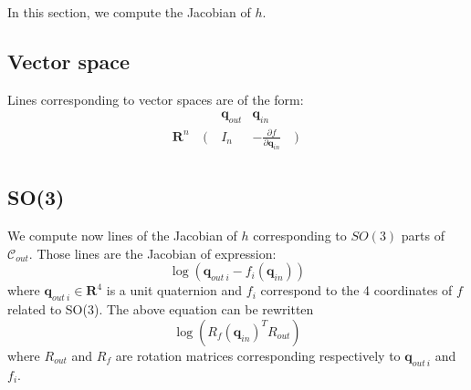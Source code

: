\documentclass {article}
\newcommand\reals{\mathbf{R}}
\newcommand\CS{\mathcal{C}}
\newcommand\conf{\mathbf{q}}
\begin{document}
In this section, we compute the Jacobian of $h$.

\subsection {Vector space}

Lines corresponding to vector spaces are of the form:
$$
\begin{array}{ccccc}
&&\conf_{out}& \conf_{in} \\
\reals^n & \left(\right. & I_{n} & -\frac{\partial f}{\partial\conf_{in}} & \left.\right)\\
\end{array}
$$

\subsection {SO(3)}

We compute now lines of the Jacobian of $h$ corresponding to $SO(3)$ parts of $\CS_{out}$. Those lines are the Jacobian of expression:
\begin{equation}\label{eq:SO3-implicit}
\log (\conf_{out\ i} - f_{i}(\conf_{in}))
\end{equation}
where $\conf_{out\ i}\in\reals^4$ is a unit quaternion and $f_{i}$ correspond to
the 4 coordinates of $f$ related to SO(3). The above equation can be rewritten
\begin{equation}\label{eq:SO3-implicit-R}
\log (R_{f}(\conf_{in})^T R_{out})
\end{equation}
where $R_{out}$ and $R_{f}$ are rotation matrices corresponding respectively to
$\conf_{out\ i}$ and $f_{i}$.
\end{document}
